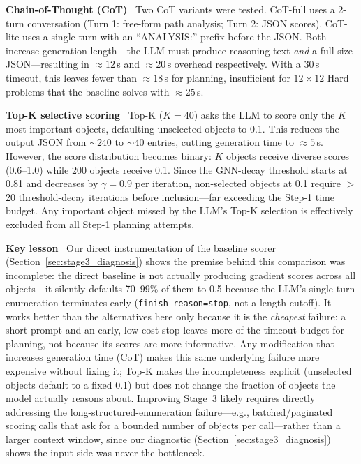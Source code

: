 \documentclass[letterpaper, 10pt, journal, twoside]{IEEEtran}
\newcommand{\sref}[1]{Section~\ref{#1}}
\newcommand{\myparagraph}[1]{\noindent\textbf{#1}~}
\begin{document}
\myparagraph{Chain-of-Thought (CoT)}
Two CoT variants were tested. CoT-full uses a 2-turn conversation (Turn 1: free-form path analysis; Turn 2: JSON scores). CoT-lite uses a single turn with an ``ANALYSIS:'' prefix before the JSON.
Both increase generation length---the LLM must produce reasoning text \emph{and} a full-size JSON---resulting in ${\approx}12$\,s and ${\approx}20$\,s overhead respectively.
With a 30\,s timeout, this leaves fewer than ${\approx}18$\,s for planning, insufficient for $12{\times}12$ Hard problems that the baseline solves with ${\approx}25$\,s.

\myparagraph{Top-K selective scoring}
Top-K ($K{=}40$) asks the LLM to score only the $K$ most important objects, defaulting unselected objects to 0.1.
This reduces the output JSON from ${\sim}240$ to ${\sim}40$ entries, cutting generation time to ${\approx}5$\,s.
However, the score distribution becomes binary: $K$ objects receive diverse scores (0.6--1.0) while $200$ objects receive 0.1.
Since the GNN-decay threshold starts at 0.81 and decreases by $\gamma{=}0.9$ per iteration, non-selected objects at 0.1 require $>$20 threshold-decay iterations before inclusion---far exceeding the Step-1 time budget.
Any important object missed by the LLM's Top-K selection is effectively excluded from all Step-1 planning attempts.

\myparagraph{Key lesson}
Our direct instrumentation of the baseline scorer (\sref{sec:stage3_diagnosis}) shows the premise behind this comparison was incomplete: the direct baseline is not actually producing gradient scores across all objects---it silently defaults 70--99\% of them to 0.5 because the LLM's single-turn enumeration terminates early (\texttt{finish\_reason=stop}, not a length cutoff).
It works better than the alternatives here only because it is the \emph{cheapest} failure: a short prompt and an early, low-cost stop leaves more of the timeout budget for planning, not because its scores are more informative.
Any modification that increases generation time (CoT) makes this same underlying failure more expensive without fixing it; Top-K makes the incompleteness explicit (unselected objects default to a fixed 0.1) but does not change the fraction of objects the model actually reasons about.
Improving Stage~3 likely requires directly addressing the long-structured-enumeration failure---e.g., batched/paginated scoring calls that ask for a bounded number of objects per call---rather than a larger context window, since our diagnostic (\sref{sec:stage3_diagnosis}) shows the input side was never the bottleneck.
\end{document}
